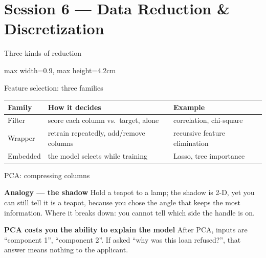 \documentclass[10pt,aspectratio=169]{beamer}
\newcommand{\trapbox}[2]{%
  \begin{alertblock}{\textbf{#1}}
  #2
  \end{alertblock}%
}
\newcommand{\analogybox}[2]{%
  \begin{exampleblock}{\textbf{Analogy --- #1}}
  #2
  \end{exampleblock}%
}
\begin{document}
\section{Session 6 --- Data Reduction \& Discretization}

\begin{frame}{Three kinds of reduction}
\begin{center}
\begin{adjustbox}{max width=0.9\linewidth, max height=4.2cm}
\end{adjustbox}
\end{center}
\end{frame}

\begin{frame}{Feature selection: three families}
\begin{table}
\small
\begin{tabularx}{\linewidth}{@{}lXl@{}}
\toprule
\textbf{Family} & \textbf{How it decides} & \textbf{Example} \\
\midrule
Filter & score each column vs.\ target, alone & correlation, chi-square \\
Wrapper & retrain repeatedly, add/remove columns & recursive feature elimination \\
Embedded & the model selects while training & Lasso, tree importance \\
\bottomrule
\end{tabularx}
\end{table}
\end{frame}

\begin{frame}{PCA: compressing columns}
\analogybox{the shadow}{Hold a teapot to a lamp; the shadow is 2-D, yet you can still tell it is a teapot, because you chose the angle that keeps the most information. Where it breaks down: you cannot tell which side the handle is on.}
\trapbox{PCA costs you the ability to explain the model}{After PCA, inputs are ``component 1'', ``component 2''. If asked ``why was this loan refused?'', that answer means nothing to the applicant.}
\end{frame}
\end{document}
